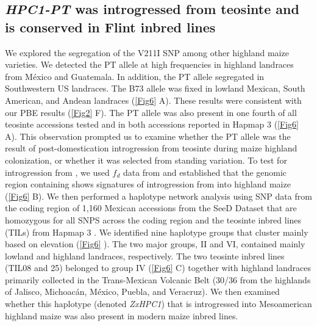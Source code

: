 \subsection{\textit{HPC1-PT} was introgressed from teosinte \mex and is conserved in Flint inbred lines}
We explored the segregation of the V211I SNP among other highland maize varieties.
We detected the PT allele at high frequencies in highland landraces from M\'exico and Guatemala. 
In addition, the PT allele segregated in Southwestern US landraces. 
The B73 allele was fixed in lowland Mexican, South American, and Andean landraces (\autoref{Fig6} A). 
These results were consistent with our PBE results (\autoref{Fig2} F).
The PT allele was also present in one fourth of all teosinte \parv accessions tested and in both \mex accessions reported in Hapmap 3 \citep{bukowski2017-ng} (\autoref{Fig6} A). 
This observation prompted us to examine whether the PT allele was the result of post-domestication introgression from teosinte \mex during maize highland colonization, or whether it was selected from \parv standing variation.
To test for introgression from \mex, we used \(f_d\) data from \citep{gonzalez-segovia2019-jy} and established that the genomic region containing \hpc shows signatures of introgression from \mex into highland maize (\autoref{Fig6} B).
We then performed a haplotype network analysis using SNP data from the \hpc coding region of 1,160 Mexican accessions from the SeeD Dataset \citep{romero_navarro2017-cn} that are homozygous for all SNPS across the coding region and the teosinte inbred lines (TILs) from Hapmap 3 \citep{bukowski2017-ng}.   
We identified nine haplotype groups that cluster mainly based on elevation (\autoref{Fig6} ). 
The two major groups, II and VI, contained mainly lowland and highland landraces, respectively. 
The two \mex teosinte inbred lines (TIL08 and 25) belonged to group IV  (\autoref{Fig6} C) together with highland landraces primarily collected in the Trans-Mexican Volcanic Belt (30/36 from the highlands of Jalisco, Michoacán, M\'exico, Puebla, and Veracruz).
We then examined whether this \mex haplotype (denoted \textit{ZxHPC1}) that is introgressed into Mesoamerican highland maize was also present in modern maize inbred lines. 

